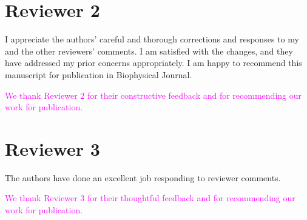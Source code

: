 \documentclass[11pt, letterpaper]{article}%
\newcommand{\response}{\textcolor{magenta}}
\begin{document}
\section*{Reviewer 2} I appreciate the authors' careful and thorough corrections and responses to my and the other reviewers' comments. I am satisfied with the changes, and they have addressed my prior concerns appropriately. I am happy to recommend this manuscript for publication in Biophysical Journal.

\response{We thank Reviewer 2 for their constructive feedback and for recommending our work for publication.}


\section*{Reviewer 3} The authors have done an excellent job responding to reviewer comments.

\response{We thank Reviewer 3 for their thoughtful feedback and for recommending our work for publication.}

    
\end{document}
